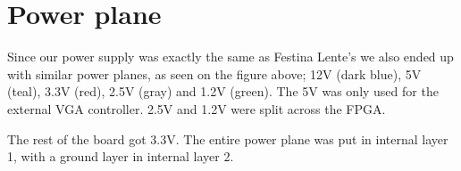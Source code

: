 \section {Power plane}



Since our power supply was exactly the same as Festina Lente's we also ended up
with similar power planes, as seen on the figure above; 12V (dark blue), 5V (teal), 
3.3V (red), 2.5V (gray) and 1.2V (green). The 5V was only used for the external 
\ac{VGA} controller. 2.5V and 1.2V were split across the \ac{FPGA}.

The rest of the board got 3.3V. The entire power plane was put in internal layer
1, with a ground layer in internal layer 2.
